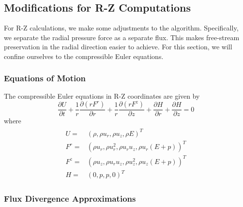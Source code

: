 \subsection{Modifications for R-Z Computations}

For R-Z calculations, we make some adjustments to the algorithm.
Specifically, we separate the radial pressure force as a separate
flux.  This makes free-stream preservation in the radial direction
easier to achieve.  For this section, we will confine ourselves to the
compressible Euler equations.

\subsubsection{Equations of Motion}
The compressible Euler equations in R-Z coordinates are given by
\begin{equation}
\frac{\partial U}{\partial t} + 
\frac{1}{r} \frac{\partial (r F^r)}{\partial r}+
\frac{1}{r}\frac{\partial (r F^z)}{\partial z} +
\frac{\partial H}{\partial r} + \frac{\partial H}{\partial z} = 0
\end{equation}
where
\begin{align}
\begin{split}
U   =& (\rho     , \rho u_r    ,  \rho u_z    , \rho E          )^T \\
F^r =& (\rho u_r , \rho u^2_r  ,  \rho u_r u_z, \rho u_r (E + p))^T \\
F^z =& (\rho u_z , \rho u_r u_z,  \rho u^2_z  , \rho u_z (E + p))^T \\
H   =& ( 0       ,       p     ,    p         , 0               )^T
\end{split}
\end{align}

\subsubsection{Flux Divergence Approximations}

